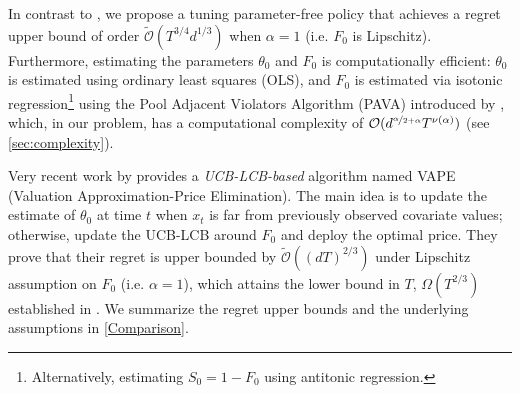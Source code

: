 In contrast to \cite{fan2021policy,luo2022contextual, xu2022towards}, we propose a tuning parameter-free policy that achieves a regret upper bound of order $\widetilde{\mathcal{O}}(T^{3/4} d^{1/3})$ when $\alpha =1$ (i.e. $F_0$ is Lipschitz). Furthermore, estimating the parameters $\theta_0$ and $F_0$ is computationally efficient: $\theta_0$ is estimated using ordinary least squares (OLS), and $F_0$ is estimated via isotonic regression\footnote{Alternatively, estimating $S_0=1 - F_0$ using antitonic regression.} using the Pool Adjacent Violators Algorithm (PAVA) introduced by \citet{robertson1988order}, which, in our problem, has a computational complexity of $\mathcal{O}(d^{\nicefrac{\alpha}{2+\alpha}}T^{\nu(\alpha)})$ (see \cref{sec:complexity}). 

Very recent work by \cite{tullii2024improved} provides a \textit{UCB-LCB-based} algorithm named VAPE (Valuation Approximation-Price Elimination). The main idea is to update the estimate of $\theta_0$ at time $t$ when $x_t$ is far from previously observed covariate values; otherwise, update the UCB-LCB around $F_0$ and deploy the optimal price. They prove that their regret is upper bounded by $\widetilde{\mathcal{O}}((dT)^{2/3})$ under Lipschitz assumption on $F_0$ (i.e. $\alpha =1$), which attains the lower bound in $T$, $\Omega(T^{2/3})$ established in \cite{xu2022towards}. We summarize the regret upper bounds and the underlying assumptions in \cref{Comparison}. 

